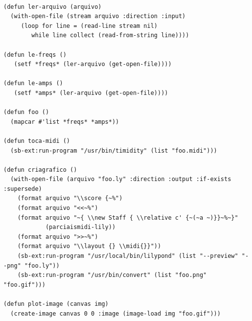 \documentclass[draft]{ppgmus}
\begin{document}
\begin{verbatim}

(defun ler-arquivo (arquivo)
  (with-open-file (stream arquivo :direction :input)
     (loop for line = (read-line stream nil)
        while line collect (read-from-string line))))

(defun le-freqs ()
   (setf *freqs* (ler-arquivo (get-open-file))))

(defun le-amps ()
   (setf *amps* (ler-arquivo (get-open-file))))

(defun foo ()
  (mapcar #'list *freqs* *amps*))

(defun toca-midi ()
  (sb-ext:run-program "/usr/bin/timidity" (list "foo.midi")))

(defun criagrafico ()
  (with-open-file (arquivo "foo.ly" :direction :output :if-exists :supersede)
    (format arquivo "\\score {~%")
    (format arquivo "<<~%")
    (format arquivo "~{ \\new Staff { \\relative c' {~(~a ~)}}~%~}"
            (parciaismidi-lily))
    (format arquivo ">>~%")
    (format arquivo "\\layout {} \\midi{}}"))
    (sb-ext:run-program "/usr/local/bin/lilypond" (list "--preview" "--png" "foo.ly"))
    (sb-ext:run-program "/usr/bin/convert" (list "foo.png" "foo.gif")))

(defun plot-image (canvas img)
  (create-image canvas 0 0 :image (image-load img "foo.gif")))


\end{verbatim}
\end{document}
